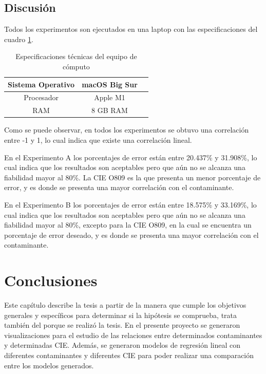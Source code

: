 \clearpage
\section{Discusión}
Todos los experimentos son ejecutados en una laptop con las especificaciones del cuadro \ref{tab:Especificaciones técnicas del PC}.
\begin{table}[H]
	{\centering
		\caption{Especificaciones técnicas del equipo de cómputo}
		\begin{tabular}{|c|c|c|}
			\hline
			Sistema Operativo & macOS Big Sur\\
			\hline
			Procesador & Apple M1\\
			\hline
			RAM & 8 GB RAM\\
			\hline
		\end{tabular}

	\label{tab:Especificaciones técnicas del PC}
	}
\end{table}

Como se puede observar, en todos los experimentos se obtuvo una correlación entre -1 y 1, lo cual indica que existe una correlación lineal.

En el Experimento A los porcentajes de error están entre 20.437\% y 31.908\%, lo cual indica que los resultados son aceptables pero que aún no se alcanza una fiabilidad mayor al 80\%. La CIE \citep{r9} O809 es la que presenta un menor porcentaje de error, y es donde se presenta una mayor correlación con el contaminante.

En el Experimento B los porcentajes de error están entre 18.575\% y 33.169\%, lo cual indica que los resultados son aceptables pero que aún no se alcanza una fiabilidad mayor al 80\%, excepto para la CIE \citep{r9} O809, en la cual se encuentra un porcentaje de error deseado, y es donde se presenta una mayor correlación con el contaminante.


\chapter{Conclusiones}
Este capítulo describe la tesis a partir de la manera que cumple los objetivos generales y específicos para determinar si la hipótesis se comprueba, trata también del porque se realizó la tesis.
En el presente proyecto se generaron visualizaciones para el estudio de las relaciones entre determinados contaminantes y determinadas CIE. Además, se generaron modelos de regresión lineal con diferentes contaminantes y diferentes CIE para poder realizar una comparación entre los modelos generados.

